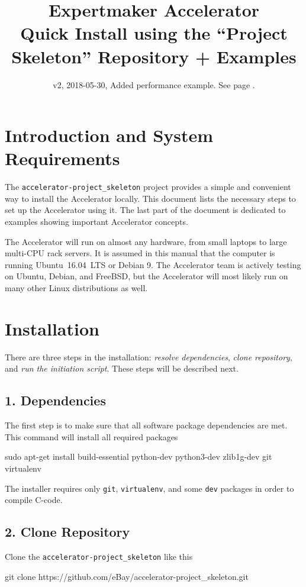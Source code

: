 \documentclass[a4paper]{article}
\title{\vspace{-20mm}Expertmaker Accelerator\\[1ex]\Large{Quick Install using the ``Project Skeleton'' Repository + Examples}}
\date{v2, 2018-05-30, Added performance example.  See page \pageref{example:datasetperf}.}
\begin{document}
\maketitle

\section*{Introduction and System Requirements}
The \texttt{accelerator-project\_skeleton} project provides a simple
and convenient way to install the Accelerator locally.  This document
lists the necessary steps to set up the Accelerator using it.  The
last part of the document is dedicated to examples showing important
Accelerator concepts.

The Accelerator will run on almost any hardware, from small laptops to
large multi-CPU rack servers.  It is assumed in this manual that the
computer is running Ubuntu~16.04~LTS or Debian 9.  The Accelerator
team is actively testing on Ubuntu, Debian, and FreeBSD, but the
Accelerator will most likely run on many other Linux distributions as well.


\section*{Installation}
There are three steps in the installation: \textsl{resolve dependencies}, \textsl{clone
repository}, and \textsl{run the initiation script}.  These steps will be
described next.
\subsection*{1. Dependencies}
The first step is to make sure that all software package dependencies
are met.  This command will install all required packages
\begin{shell}
sudo apt-get install build-essential python-dev python3-dev zlib1g-dev git virtualenv
\end{shell}
The installer requires only \texttt{git}, \texttt{virtualenv}, and
some \texttt{dev} packages in order to compile C-code.

\subsection*{2. Clone Repository}
Clone the \texttt{accelerator-project\_skeleton} like this
\begin{shell}
git clone https://github.com/eBay/accelerator-project_skeleton.git
\end{shell}
\end{document}
